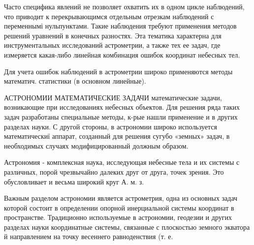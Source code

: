 \documentclass[10pt]{article}
\begin{document}
Часто специфика явлений не позволяет охватить их в одном цикле наблюдений, что приводит к перекрывающимся отдельным отрезкам наблюдений с переменнымі нульпунктами. Такие наблюдения требуют применения методов решений уравнений в конечных разностях. Эта тематика характерна для инструментальных исследований астрометрии, а также тех ее задач, где измеряется какая-либо линейная комбинация ошибок координат небесных тел.



Для учета ошибок наблюдений в астрометрии широко применяются методы математич. статистики (в основном линейные).



АСТРОНОМИИ МАТЕМАТИЧЕСКИЕ ЗАДАЧИ математические задачи, возникающие при исследованиях небесных объектов. Для решения ряда таких задач разработаны специальные методы, к-рые нашли применение и в других разделах науки. С другой стороны, в астрономии широко используется математическиї аппарат, созданный для решения сугубо «земных» задач, в необходимых случаях модифицированный должным образом.



Астрономия - комплексная наука, исследующая небесные тела и их системы с различных, порой чрезвычайно далеких друг от друга, точек зрения. Это обусловливает и весьма широкий круг А. м. з.



Важным разделом астрономии является астрометрия, одна из основных задач которой состоит в определении опорной инерциальной системы координат в пространстве. Традиционно используемые в астрономии, геодезии и других разделах науки координатные системы, связанные с плоскостью земного экватора й направлением на точку весеннего равноденствия (т. е.
\end{document}
